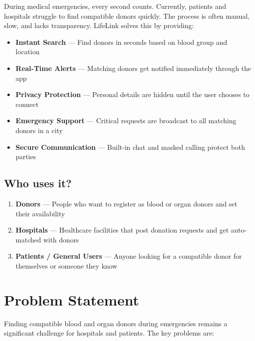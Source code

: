 \documentclass[12pt,a4paper]{article}
\begin{document}
During medical emergencies, every second counts. Currently, patients and hospitals struggle to find compatible donors quickly. The process is often manual, slow, and lacks transparency. LifeLink solves this by providing:

\begin{itemize}[leftmargin=*]
    \item \textbf{Instant Search} --- Find donors in seconds based on blood group and location
    \item \textbf{Real-Time Alerts} --- Matching donors get notified immediately through the app
    \item \textbf{Privacy Protection} --- Personal details are hidden until the user chooses to connect
    \item \textbf{Emergency Support} --- Critical requests are broadcast to all matching donors in a city
    \item \textbf{Secure Communication} --- Built-in chat and masked calling protect both parties
\end{itemize}

\subsection{Who uses it?}

\begin{enumerate}[leftmargin=*]
    \item \textbf{Donors} --- People who want to register as blood or organ donors and set their availability
    \item \textbf{Hospitals} --- Healthcare facilities that post donation requests and get auto-matched with donors
    \item \textbf{Patients / General Users} --- Anyone looking for a compatible donor for themselves or someone they know
\end{enumerate}

\section{Problem Statement}

Finding compatible blood and organ donors during emergencies remains a significant challenge for hospitals and patients. The key problems are:
\end{document}
